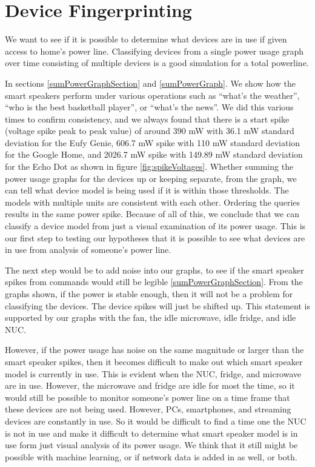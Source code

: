 \section{Device Fingerprinting}
We want to see if it is possible to determine what devices are in use if given access to home's power line. Classifying devices from a single power usage graph over time consisting of multiple devices is a good simulation for a total powerline.

In sections \ref{sumPowerGraphSection} and \ref{sumPowerGraph}. We show how the smart speakers perform under various operations such as ``what's the weather'', ``who is the best basketball player'', or ``what's the news''. We did this various times to confirm consistency, and we always found that there is a start spike (voltage spike peak to peak value) of around 390 mW with 36.1 mW standard deviation for the Eufy Genie, 606.7 mW spike with 110 mW standard deviation for the Google Home, and 2026.7 mW spike with 149.89 mW standard deviation for the Echo Dot as shown in figure \ref{fig:spikeVoltages}. Whether summing the power usage graphs for the devices up or keeping separate, from the graph, we can tell what device model is being used if it is within those thresholds. The models with multiple units are consistent with each other. Ordering the queries results in the same power spike. Because of all of this, we conclude that we can classify a device model from just a visual examination of its power usage. This is our first step to testing our hypotheses that it is possible to see what devices are in use from analysis of someone's power line.

The next step would be to add noise into our graphs, to see if the smart speaker spikes from commands would still be legible \ref{sumPowerGraphSection}. From the graphs shown, if the power is stable enough, then it will not be a problem for classifying the devices. The device spikes will just be shifted up. This statement is supported by our graphs with the fan, the idle microwave, idle fridge, and idle NUC.

However, if the power usage has noise on the same magnitude or larger than the smart speaker spikes, then it becomes difficult to make out which smart speaker model is currently in use. This is evident when the NUC, fridge, and microwave are in use. However, the microwave and fridge are idle for most the time, so it would still be possible to monitor someone's power line on a time frame that these devices are not being used. However, PCs, smartphones, and streaming devices are constantly in use. So it would be difficult to find a time one the NUC is not in use and make it difficult to determine what smart speaker model is in use form just visual analysis of its power usage. We think that it still might be possible with machine learning, or if network data is added in as well, or both.

